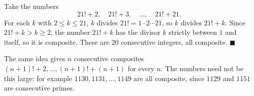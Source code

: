 Take the numbers
\[21!+2,\quad21!+3,\quad\dots,\quad21!+21.\]
For each $k$ with $2\le k\le21$, $k$ divides $21!=1\cdot2\cdots21$, so $k$ divides $21!+k$. Since $21!+k>k\ge2$, the number $21!+k$ has the divisor $k$ strictly between $1$ and itself, so it is composite. These are $20$ consecutive integers, all composite. $\blacksquare$

The same idea gives $n$ consecutive composites $(n+1)!+2,\dots,(n+1)!+(n+1)$ for every $n$. The numbers need not be this large: for example $1130,1131,\dots,1149$ are all composite, since $1129$ and $1151$ are consecutive primes.
